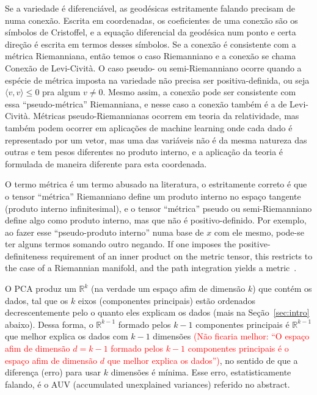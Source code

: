 \documentclass[a4paper,titlepage]{article}
\newcommand{\juliana}[1]{\textcolor{red}{#1}}
\begin{document}
Se a variedade é diferenciável, as geodésicas estritamente falando precisam
de numa conexão. Escrita em coordenadas, os coeficientes de uma conexão são os
símbolos de Cristoffel, e a equação diferencial da geodésica num ponto e certa
direção é escrita em termos desses símbolos. Se a conexão é consistente com a métrica
Riemanniana, então temos o caso Riemanniano e a conexão se chama Conexão de
Levi-Cività. O caso pseudo- ou semi-Riemanniano
ocorre quando a espécie de métrica imposta na variedade não precisa ser
positiva-definida, ou seja $\langle v,v\rangle \leq 0$ pra algum $v\neq 0$. Mesmo assim, a conexão
pode ser consistente com essa ``pseudo-métrica'' Riemanniana, e nesse caso
a conexão também é a de Levi-Cività. Métricas pseudo-Riemannianas ocorrem em
teoria da relatividade, mas também podem ocorrer em aplicações de machine
learning onde cada dado é representado por um vetor, mas uma das variáveis não é
da mesma natureza das outras e tem pesos diferentes no produto interno, e a
aplicação da teoria é formulada de maneira diferente para esta coordenada.

\begin{remark}
O termo métrica é um termo abusado na literatura, o estritamente correto é que
o tensor ``métrica'' Riemanniano define um produto interno no espaço tangente
(produto interno infinitesimal), e 
o tensor ``métrica'' pseudo ou semi-Riemanniano define algo como produto
interno, mas que não é positivo-definido. Por exemplo, ao fazer esse
``pseudo-produto interno'' numa base de $x$ com ele mesmo, pode-se ter alguns
termos somando outro negando.
If one imposes the positive-definiteness requirement of an inner product on
the metric tensor, this restricts to the case of a Riemannian manifold, and the
path integration yields a metric~\cite{wikipedia:metric:2021}.
\end{remark}



{
\vspace{1em}
\vspace{1em}
}

O PCA produz um $\mathbb R^k$ (na verdade um espaço afim de dimensão $k$) que
contém os dados, tal que os $k$ eixos (componentes principais) estão ordenados decrescentemente pelo o quanto eles explicam os dados (mais na Seção~\ref{sec:intro} abaixo). Dessa forma, o $\mathbb R^{k-1}$ formado pelos
$k-1$ componentes principais é $\mathbb R^{k-1}$ que melhor explica os dados com
$k-1$ dimensões \juliana{(Não ficaria melhor: ``O espaço afim de dimensão $d=k-1$ formado pelos $k-1$ componentes principais é o espaço afim de dimensão $d$ que melhor explica os dados'')}, no sentido de que a diferença (erro) para usar $k$ dimensões é mínima. Esse erro, estatisticamente falando, é o AUV (accumulated unexplained
variances) referido no abstract. 
\end{document}
